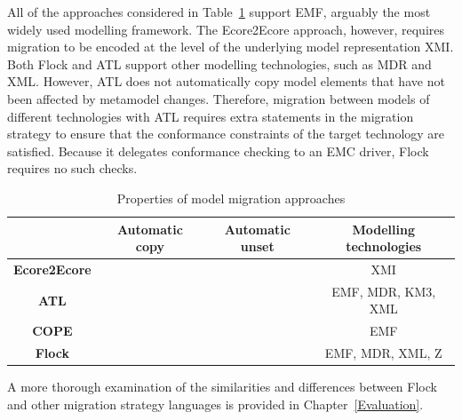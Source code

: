 All of the approaches considered in Table~\ref{tab:differences} support EMF, arguably the most widely used modelling framework. The Ecore2Ecore approach, however, requires migration to be encoded at the level of the underlying model representation XMI. Both Flock and ATL support other modelling technologies, such as MDR and XML. However, ATL does not automatically copy model elements that have not been affected by metamodel changes. Therefore, migration between models of different technologies with ATL requires extra statements in the migration strategy to ensure that the conformance constraints of the target technology are satisfied. Because it delegates conformance checking to an EMC driver, Flock requires no such checks.

\begin{table}[b]
	\caption{Properties of model migration approaches}
	\centering
	\begin{tabular}{|c|c|c|c|}
		\hline
		             & \textbf{Automatic copy} & \textbf{Automatic unset} & \textbf{Modelling technologies} \\
		\hline
		\textbf{Ecore2Ecore}  & \tick             & \cross              & XMI                    \\
		\hline
		\textbf{ATL}          & \cross            & \tick               & EMF, MDR, KM3, XML     \\
		\hline
		\textbf{COPE}         & \tick             & \cross              & EMF                    \\
		\hline
		\textbf{Flock}        & \tick             & \tick               & EMF, MDR, XML, Z       \\
		\hline
	\end{tabular}
	\label{tab:differences}
\end{table}

A more thorough examination of the similarities and differences between Flock and other migration strategy languages is provided in Chapter~\ref{Evaluation}.
